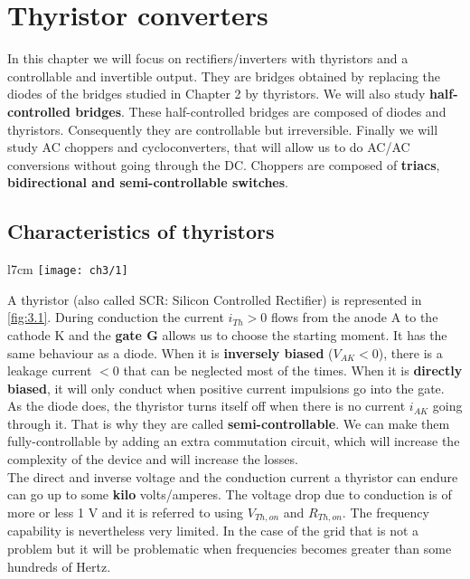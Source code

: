 
\chapter{Thyristor converters}
	In this chapter we will focus on rectifiers/inverters with thyristors and a controllable and invertible output. They are bridges obtained by replacing the diodes of the bridges studied in Chapter 2 by thyristors. We will also study \textbf{half-controlled bridges}. These half-controlled bridges are composed of diodes and thyristors. Consequently they are controllable but irreversible. Finally we will study AC choppers and cycloconverters, that will allow us to do AC/AC conversions without going through the DC. Choppers are composed of \textbf{triacs}, \textbf{bidirectional and semi-controllable switches}. 
	
	\section{Characteristics of thyristors}
		\begin{wrapfigure}[8]{l}{7cm}
		\vspace{-5mm}
		\texttt{[image: ch3/1]}
		\label{fig:3.1}
		\end{wrapfigure}
		A thyristor (also called SCR: Silicon Controlled Rectifier) is represented in \autoref{fig:3.1}. During conduction the current $i_{Th} > 0$ flows from the anode A to the cathode K and the \textbf{gate G} allows us to choose the starting moment. It has the same behaviour as a diode. When it is \textbf{inversely biased} ($V_{AK}<0$), there is a leakage current $<0$ that can be neglected most of the times. When it is \textbf{directly biased}, it will only conduct when positive current impulsions go into the gate. As the diode does, the thyristor turns itself off when there is no current $i_{AK}$ going through it. That is why they are called \textbf{semi-controllable}. We can make them fully-controllable by adding an extra commutation circuit, which will increase the complexity of the device and will increase the losses. \\
		
		The direct and inverse voltage and the conduction current a thyristor can endure can go up to some \textbf{kilo} volts/amperes. The voltage drop due to conduction is of more or less 1 V and it is referred to using $V_{Th,on}$ and $R_{Th,on}$. The frequency capability is nevertheless very limited. In the case of the grid that is not a problem but it will be problematic when frequencies becomes greater than some hundreds of Hertz. 


